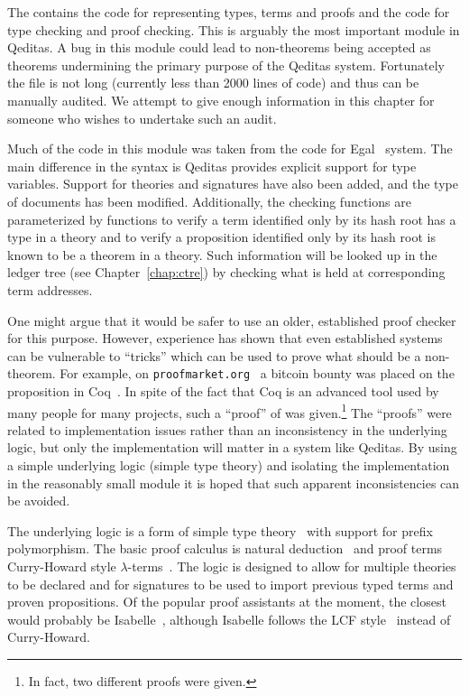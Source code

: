 The  contains the code for representing types,
terms and proofs
and the code for type checking and proof checking.
This is arguably the most important module in Qeditas.
A bug in this module could lead to non-theorems being accepted as theorems
undermining the primary purpose of the Qeditas system.
Fortunately the  file is not long (currently less than 2000 lines of code)
and thus can be manually audited.
We attempt to give enough information in this chapter for someone who wishes to undertake such an audit.

Much of the code in this module was taken from the code for Egal~\cite{Brown2014} system.
The main difference in the syntax is Qeditas provides explicit support for type variables.
Support for theories and signatures have also been added, and the type of documents has been modified.
Additionally, the checking functions are parameterized by functions to verify a term
identified only by its hash root has a type in a theory
and to verify a proposition identified only by its hash root is known to be a theorem in a theory.
Such information will be looked up in the ledger tree (see Chapter~\ref{chap:ctre}) by checking what is held at corresponding term addresses.

One might argue that it would be safer to use an older, established proof checker for this purpose.
However, experience has shown that even established systems can be vulnerable to ``tricks''
which can be used to prove what should be a non-theorem.
For example, on {\tt{proofmarket.org}}~\cite{ProofMarket}
a bitcoin bounty was placed on the proposition {} in Coq~\cite{Coq:manual}.
In spite of the fact that Coq is an advanced tool used by many people for many projects,
such a ``proof'' of {} was given.\footnote{In fact, two different proofs were given.}
The ``proofs'' were related to implementation issues rather than an inconsistency
in the underlying logic, but only the implementation will matter in a system like Qeditas.
By using a simple underlying logic (simple type theory)
and isolating the implementation in the reasonably small module {}
it is hoped that such apparent inconsistencies can be avoided.

The underlying logic is a form of simple type theory~\cite{Church40}
with support for prefix polymorphism.
The basic proof calculus is natural deduction~\cite{gent36,praw65}
and proof terms Curry-Howard style $\lambda$-terms~\cite{howa80}.
The logic is designed to allow for multiple theories to be
declared and for signatures to be used to import previous
typed terms and proven propositions.
Of the popular proof assistants at the moment,
the closest would probably be Isabelle~\cite{Nipkow-Paulson-Wenzel:2002},
although Isabelle follows the LCF style~\cite{GORDON79} instead of
Curry-Howard.

